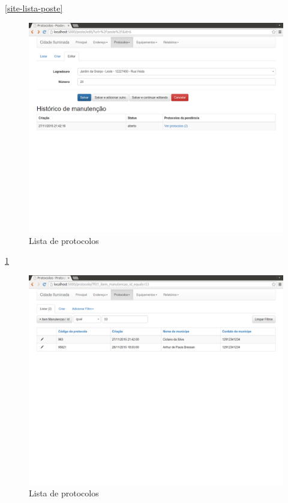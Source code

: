 \documentclass[
	article,			%
	11pt,				%
	oneside,			%
	a4paper,			%
	english,			%
	brazil,				%
	sumario=tradicional
	]{abntex2}
\begin{document}
\ref{site-lista-poste}

\begin{figure}[!htbp]
 \centering
 \caption{\label{site-historico-manutencao}Lista de protocolos}
 \includegraphics[scale=0.25]{site/5-historico_manutencao_poste.png}
\end{figure}

\ref{site-historico-manutencao}
\clearpage

\begin{figure}[!htbp]
 \centering
 \caption{\label{site-protocolos-poste}Lista de protocolos}
 \includegraphics[scale=0.25]{site/6-protocolos_poste.png}
\end{figure}
\end{document}
